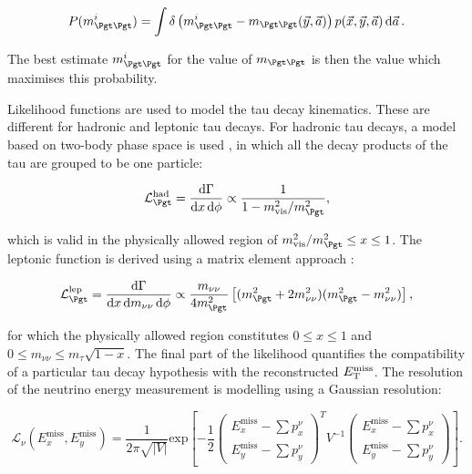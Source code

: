 \begin{equation} \label{eqn:svfit-prob}
P(m_{\Pgt\Pgt}^{i}) = \int\delta\left(m_{\Pgt\Pgt}^{i} -
m_{\Pgt\Pgt}(\vec{y},\vec{a})\right)p(\vec{x},\vec{y},\vec{a})\,\text{d}\vec{a}\,
.
\end{equation}

The best estimate $m_{\Pgt\Pgt}^{i}$ for the value of $m_{\Pgt\Pgt}$ is then the value which maximises this probability. 

Likelihood functions are used to model the tau decay kinematics. These are
different for hadronic and leptonic tau decays. For hadronic tau decays, a model
based on two-body phase space is used \cite{PDG}, in which all the decay products of the
tau are grouped to be one particle:

\begin{equation}
\mathcal{L}_{\Pgt}^{\text{had}} = \frac{\text{d}\Gamma}{\text{d}x\,\text{d}\phi}
\propto \frac{1}{1 - m_{\text{vis}}^{2} / m_{\Pgt}^{2}},
\end{equation}

which is valid in the physically allowed region of $m_{\text{vis}}^{2} /
m_{\Pgt}^{2} \leq x \leq 1$. The leptonic function is derived using a matrix
element approach \cite{TauPol}:

\begin{equation}
\mathcal{L}_{\Pgt}^{\text{lep}} =
\frac{\text{d}\Gamma}{\text{d}x\,\text{d}m_{\nu\nu}\,\text{d}\phi} \propto
\frac{m_{\nu\nu}}{4m_{\Pgt}^{2}}\left[(m_{\Pgt}^{2}+2m_{\nu\nu}^{2})(m_{\Pgt}^{2}-m_{\nu\nu}^{2})\right],
\end{equation}

for which the physically allowed region constitutes $0 \leq x \leq 1$ and $0
\leq m_{\nu\nu} \leq m_{\tau}\sqrt{1-x}$. The final part of the likelihood
quantifies the compatibility of a particular tau decay hypothesis with the
reconstructed $E_{\mathrm{T}}^{\text{miss}}$. The resolution of the neutrino energy measurement is
modelling using a Gaussian resolution:

\begin{equation}
\mathcal{L}_{\nu}(E_{x}^{\text{miss}},E_{y}^{\text{miss}}) =
\frac{1}{2\pi\sqrt{|V|}}\text{exp}\left[
-\frac{1}{2}\begin{pmatrix}E_{x}^{\text{miss}}-\sum p_{x}^{\nu} \\
E_{y}^{\text{miss}}-\sum p_{y}^{\nu}\end{pmatrix}^{T} V^{-1}
\begin{pmatrix}E_{x}^{\text{miss}}-\sum p_{x}^{\nu} \\ E_{y}^{\text{miss}}-\sum
p_{y}^{\nu}\end{pmatrix}\right].
\end{equation}

